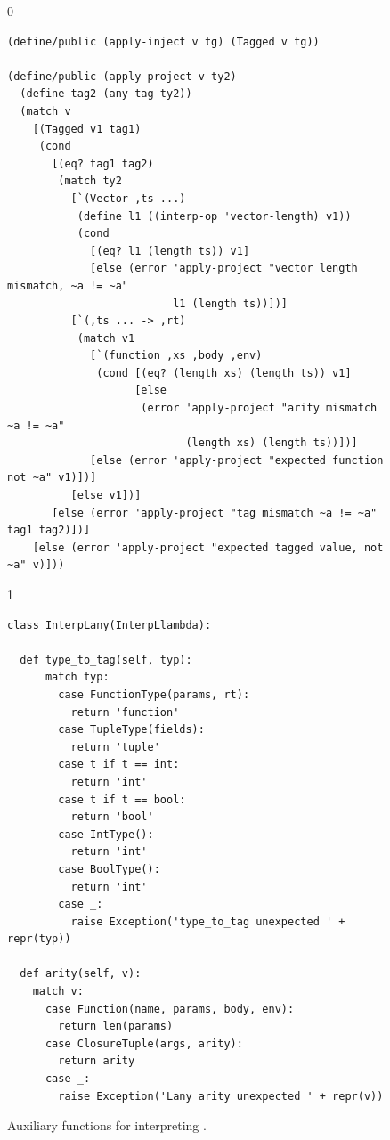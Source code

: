 \documentclass[7x10]{TimesAPriori_MIT}%
\def\racketEd{0}
\def\pythonEd{1}
\def\edition{0}
\numberwithin{theorem}{chapter}
\numberwithin{definition}{chapter}
\numberwithin{equation}{chapter}
\begin{document}
\begin{figure}[tbp]
  \begin{tcolorbox}[colback=white]  
{\if\edition\racketEd
\begin{lstlisting}[basicstyle=\ttfamily\footnotesize]
(define/public (apply-inject v tg) (Tagged v tg))

(define/public (apply-project v ty2)
  (define tag2 (any-tag ty2))
  (match v
    [(Tagged v1 tag1)
     (cond
       [(eq? tag1 tag2)
        (match ty2
          [`(Vector ,ts ...)
           (define l1 ((interp-op 'vector-length) v1))
           (cond
             [(eq? l1 (length ts)) v1]
             [else (error 'apply-project "vector length mismatch, ~a != ~a"
                          l1 (length ts))])]
          [`(,ts ... -> ,rt)
           (match v1
             [`(function ,xs ,body ,env)
              (cond [(eq? (length xs) (length ts)) v1]
                    [else
                     (error 'apply-project "arity mismatch ~a != ~a"
                            (length xs) (length ts))])]
             [else (error 'apply-project "expected function not ~a" v1)])]
          [else v1])]
       [else (error 'apply-project "tag mismatch ~a != ~a" tag1 tag2)])]
    [else (error 'apply-project "expected tagged value, not ~a" v)]))
\end{lstlisting}
\fi}
{\if\edition\pythonEd
\begin{lstlisting}
class InterpLany(InterpLlambda):

  def type_to_tag(self, typ):
      match typ:
        case FunctionType(params, rt):
          return 'function'
        case TupleType(fields):
          return 'tuple'
        case t if t == int:
          return 'int'
        case t if t == bool:
          return 'bool'
        case IntType():
          return 'int'
        case BoolType():
          return 'int'
        case _:
          raise Exception('type_to_tag unexpected ' + repr(typ))

  def arity(self, v):
    match v:
      case Function(name, params, body, env):
        return len(params)
      case ClosureTuple(args, arity):
        return arity
      case _:
        raise Exception('Lany arity unexpected ' + repr(v))
\end{lstlisting}
\fi}
  \end{tcolorbox}

  \caption{Auxiliary functions for interpreting \LangAny{}.}
  \label{fig:interp-Lany-aux}
\end{figure}

\clearpage
\end{document}
